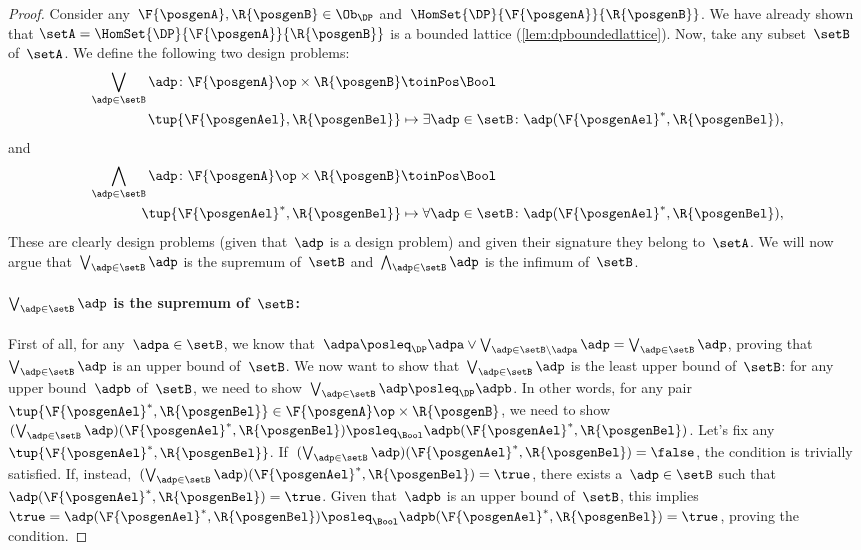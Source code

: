 \begin{proof}
    Consider any~$\F{\posgenA},\R{\posgenB}\in \Ob_\DP$ and~$\HomSet{\DP}{\F{\posgenA}}{\R{\posgenB}}$.
    We have already shown that $\setA=\HomSet{\DP}{\F{\posgenA}}{\R{\posgenB}}$ is a bounded lattice (\cref{lem:dpboundedlattice}).
    Now, take any subset~$\setB$ of~$\setA$.
    We define the following two design problems:
    \begin{equation*}
        \begin{aligned}
            \bigvee_{\adp \in \setB} \adp\colon \F{\posgenA}\op \times \R{\posgenB}&\toinPos \Bool\\
            \tup{\F{\posgenAel},\R{\posgenBel}}&\mapsto \exists \adp\in \setB\colon \adp(\F{\posgenAel}^*,\R{\posgenBel}),
        \end{aligned}
    \end{equation*}
    and
    \begin{equation*}
        \begin{aligned}
            \bigwedge_{\adp \in \setB} \adp\colon \F{\posgenA}\op \times \R{\posgenB}&\toinPos \Bool\\
            \tup{\F{\posgenAel}^*,\R{\posgenBel}}&\mapsto \forall \adp\in \setB\colon \adp(\F{\posgenAel}^*,\R{\posgenBel}),
        \end{aligned}
    \end{equation*}
    These are clearly design problems (given that~$\adp$ is a design problem) and given their signature they belong to~$\setA$.
    We will now argue that~$\bigvee_{\adp \in \setB} \adp$ is the supremum of~$\setB$ and~$\bigwedge_{\adp \in \setB} \adp$ is the infimum of~$\setB$.
    \paragraph*{$\bigvee_{\adp \in \setB} \adp$ is the supremum of~$\setB$:}
    First of all, for any~$\adpa\in \setB$, we know that~$\adpa\posleq_\DP \adpa \vee \bigvee_{\adp \in \setB \backslash \adpa} \adp= \bigvee_{\adp \in \setB} \adp$, proving that~$\bigvee_{\adp \in \setB} \adp$ is an upper bound of~$\setB$.
    We now want to show that~$\bigvee_{\adp \in \setB} \adp$ is the least upper bound of~$\setB$: for any upper bound~$\adpb$ of~$\setB$, we need to show~$\bigvee_{\adp \in \setB} \adp \posleq_\DP\adpb$.
    In other words, for any pair~$\tup{\F{\posgenAel}^*,\R{\posgenBel}}\in \F{\posgenA}\op\times \R{\posgenB}$, we need to show~$(\bigvee_{\adp \in \setB} \adp)(\F{\posgenAel}^*,\R{\posgenBel})\posleq_\Bool \adpb(\F{\posgenAel}^*,\R{\posgenBel})$.
    Let's fix any~$\tup{\F{\posgenAel}^*,\R{\posgenBel}}$. If~$(\bigvee_{\adp \in \setB} \adp)(\F{\posgenAel}^*,\R{\posgenBel})=\false$, the condition is trivially satisfied.
    If, instead,~$(\bigvee_{\adp \in \setB} \adp)(\F{\posgenAel}^*,\R{\posgenBel})=\true$, there exists a~$\adp\in \setB$ such that~$\adp(\F{\posgenAel}^*,\R{\posgenBel})=\true$.
    Given that~$\adpb$ is an upper bound of~$\setB$, this implies~$\true=\adp(\F{\posgenAel}^*,\R{\posgenBel})\posleq_\Bool \adpb(\F{\posgenAel}^*,\R{\posgenBel})=\true$, proving the condition.


\end{proof}
